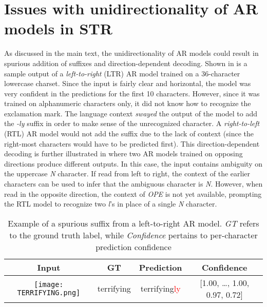 \section{Issues with unidirectionality of AR models in STR}

As discussed in the main text, the unidirectionality of AR models could result in spurious addition of suffixes and direction-dependent decoding. Shown in  is a sample output of a \textit{left-to-right} (LTR) AR model trained on a 36-character lowercase charset. Since the input is fairly clear and horizontal, the model was very confident in the predictions for the first 10 characters. However, since it was trained on alphanumeric characters only, it did not know how to recognize the exclamation mark. The language context \textit{swayed} the output of the model to add the \textit{-ly} suffix in order to make sense of the unrecognized character. A \textit{right-to-left} (RTL) AR model would not add the suffix due to the lack of context (since the right-most characters would have to be predicted first). This direction-dependent decoding is further illustrated in  where two AR models trained on opposing directions produce different outputs. In this case, the input contains ambiguity on the uppercase \textit{N} character. If read from left to right, the context of the earlier characters can be used to infer that the ambiguous character is \textit{N}. However, when read in the opposite direction, the context of \textit{OPE} is not yet available, prompting the RTL model to recognize two \textit{l}'s in place of a single \textit{N} character.

\begin{table}[htbp]
    \centering
    \setlength{\tabcolsep}{5pt}
    \caption{Example of a spurious suffix from a left-to-right AR model. \textit{GT} refers to the ground truth label, while \textit{Confidence} pertains to per-character prediction confidence}
    \label{tab:spurious-suffixes}
    \begin{tabular}{c c | c c}
        \toprule
         Input & GT & Prediction & Confidence  \\
        \midrule
         \texttt{[image: TERRIFYING.png]} & terrifying & terrifying\textcolor{red}{ly} & [1.00, \dots, 1.00, 0.97, 0.72] \\
        \bottomrule
    \end{tabular}
\end{table}

